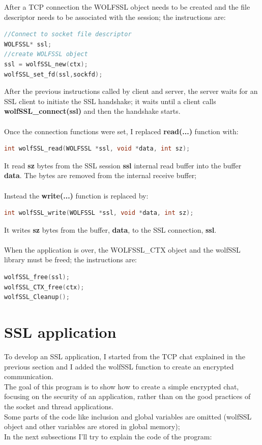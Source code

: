 \documentclass[a4paper,12pt]{report}
\begin{document}
After a TCP connection the WOLFSSL object needs to be created and the file descriptor needs to be associated with the session; the instructions are:
\begin{lstlisting}[language=c]
//Connect to socket file descriptor
WOLFSSL* ssl;
//create WOLFSSL object
ssl = wolfSSL_new(ctx);
wolfSSL_set_fd(ssl,sockfd);
\end{lstlisting}
After the previous instructions called by client and server, the server waits for an SSL client to initiate the SSL handshake; it waits until a client calls \textbf{wolfSSL\_connect(ssl)} and then the handshake starts.
\\\\Once the connection functions were set, I replaced \textbf{read(...)} function with: 
\begin{lstlisting}[language=c]
int wolfSSL_read(WOLFSSL *ssl, void *data, int sz);
\end{lstlisting}
It read \textbf{sz} bytes from the SSL session \textbf{ssl} internal read buffer into the buffer \textbf{data}. The bytes are removed from the internal receive buffer;
\\\\Instead the \textbf{write(...)} function is replaced by:
\begin{lstlisting}[language=c]
int wolfSSL_write(WOLFSSL *ssl, void *data, int sz);
\end{lstlisting}
It writes \textbf{sz} bytes from the buffer, \textbf{data}, to the SSL connection, \textbf{ssl}.
\\\\When the application is over, the WOLFSSL\_CTX object and the wolfSSL library must be freed; the instructions are:
\begin{lstlisting}[language=c]
wolfSSL_free(ssl);
wolfSSL_CTX_free(ctx);
wolfSSL_Cleanup();
\end{lstlisting}

\pagebreak
\section{SSL application}
To develop an SSL application, I started from the TCP chat explained in the previous section and I added the wolfSSL function to create an encrypted communication.
\\The goal of this program is to show how to create a simple encrypted chat, focusing on the security of an application, rather than on the good practices of the socket and thread applications.
\\Some parts of the code like inclusion and global variables are omitted (wolfSSL object and other variables are stored in global memory); 
\\In the next subsections I'll try to explain the code of the program:
\end{document}
